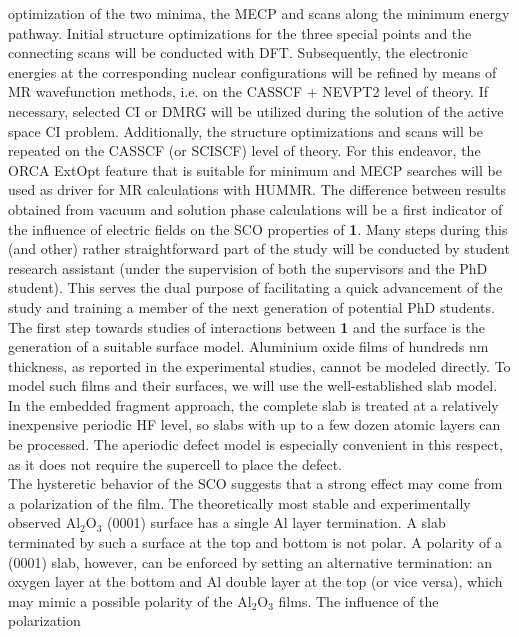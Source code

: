 \documentclass[a4paper,11pt,headings=normal]{scrartcl}
\begin{document}
\begin{itemize}
optimization of the two minima, the MECP and scans along the minimum energy 
pathway. Initial  structure optimizations for the three special points and the 
connecting scans will be conducted with DFT. Subsequently, the electronic energies 
at the corresponding nuclear configurations will be refined by means of MR 
wavefunction methods, i.e. on the CASSCF + NEVPT2 level of theory. If necessary, 
selected CI or DMRG will be utilized during the solution of the active space CI 
problem. Additionally, the 
structure optimizations and scans will be repeated on the CASSCF (or SCISCF) 
level of theory. For this endeavor, the ORCA ExtOpt feature\autocite{Neese2020b} 
that is suitable for minimum and MECP searches will be used as driver for MR 
calculations with HUMMR. The difference between results obtained from vacuum and 
solution phase calculations will be a first indicator of the influence of 
electric fields on the SCO properties of \textbf{1}.
Many steps during this (and other) rather straightforward part of the study will 
be conducted by student research assistant (under the supervision of both the 
supervisors and the PhD student). This serves the dual purpose of facilitating a 
quick advancement of the study and training a member of the next generation of 
potential PhD students.\\
The first step towards studies of interactions between \textbf{1} and the 
surface is the generation of a suitable surface model. Aluminium oxide films of 
hundreds nm thickness, as reported in the experimental studies, cannot be modeled 
directly. To model such films and their surfaces, we will use the 
well-established slab model. In the embedded fragment approach, the complete 
slab is treated at a relatively inexpensive periodic HF level, so slabs with up 
to a few dozen atomic layers can be processed. The 
aperiodic defect model is especially convenient in this respect, as it does not 
require the supercell to place the defect.\\
The hysteretic behavior of the SCO suggests that a strong effect may come from 
a polarization of the film. The theoretically most stable and 
experimentally observed Al$_2$O$_3$ (0001) surface has a single Al layer 
termination.\autocite{Kurita2010} A slab terminated by such a surface at 
the top and bottom is not polar. A polarity of a (0001) slab, however, 
can be enforced by setting an alternative termination: an oxygen layer at the 
bottom and Al double layer at the top (or vice versa), which may mimic a 
possible polarity of the Al$_2$O$_3$ films. The influence of the polarization 

\end{itemize}
\end{document}
